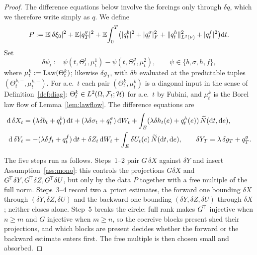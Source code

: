 \begin{proof}
The difference equations below involve the forcings only through $\delta q$, which we
therefore write simply as $q$. We define
\[
P:=\mathbb{E}|\delta\xi_0|^2+\mathbb{E}|q^g_T|^2
+\mathbb{E}\!\int_0^T\!\big(|q^b_t|^2+|q^\sigma_t|_F^2+\lVert q^h_t\rVert_{L^2(\nu)}^2+|q^f_t|^2\big)\mathrm{d} t .
\]
Set
\[
\delta\psi_t:=\psi(t,\Theta^1_t,\mu^1_t)-\psi(t,\Theta^2_t,\mu^2_t),\qquad
\psi\in\{b,\sigma,h,f\},
\]
where $\mu^k_t:=\mathrm{Law}(\Theta^k_t)$; likewise $\delta g_T$, with $\delta h$ evaluated at the
predictable tuples $(\Theta^{k,-}_t,\mu^{k,-}_t)$. For a.e.\ $t$ each pair
$(\Theta^k_t,\mu^k_t)$ is a diagonal input in the sense of Definition~\ref{def:diag}:
$\Theta^k_t\in L^2(\Omega,\mathcal{F}_t;\mathcal H)$ for a.e.\ $t$ by Fubini, and $\mu^k_t$ is
the Borel law flow of Lemma~\ref{lem:lawflow}.
The difference equations are
\begin{align}
\mathrm{d}\,\delta X_t&=(\lambda\delta b_t+q^b_t)\,\mathrm{d} t+(\lambda\delta\sigma_t+q^\sigma_t)\,\mathrm{d} W_t
+\int_E(\lambda\delta h_t(e)+q^h_t(e))\,\widetilde{N}(\mathrm{d} t,\mathrm{d} e),\label{eq:dX}\\
\mathrm{d}\,\delta Y_t&=-(\lambda\delta f_t+q^f_t)\,\mathrm{d} t+\delta Z_t\,\mathrm{d} W_t
+\int_E\delta U_t(e)\,\widetilde{N}(\mathrm{d} t,\mathrm{d} e),\qquad \delta Y_T=\lambda\,\delta g_T+q^g_T.\label{eq:dY}
\end{align}

The five steps run as follows. Steps~1--2 pair $G\,\delta X$ against $\delta Y$ and
insert Assumption~\ref{ass:mono}: this controls the projections $G\delta X$ and
$G^{\!\top}\delta Y,G^{\!\top}\delta Z,G^{\!\top}\delta U$, but only by the data $P$ together with a
free multiple of the full norm. Steps~3--4 record two a~priori estimates, the forward one
bounding $\delta X$ through $(\delta Y,\delta Z,\delta U)$ and the backward one bounding
$(\delta Y,\delta Z,\delta U)$ through $\delta X$; neither closes alone.
Step~5 breaks the circle: full rank makes $G^{\!\top}$ injective
when $n\ge m$ and $G$ injective when $m\ge n$, so the coercive blocks present shed their
projections, and which blocks are present decides whether the forward or the backward
estimate enters first. The free multiple is then chosen small and absorbed.


\end{proof}
